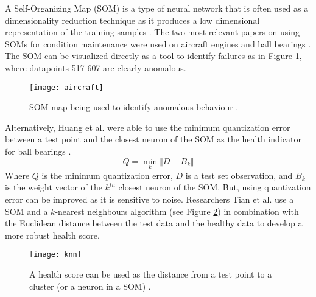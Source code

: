 A Self-Organizing Map (SOM) is a type of neural network that is often used as a dimensionality reduction technique as it produces a low dimensional representation of the training samples \cite{map1990self}.
The two most relevant papers on using SOMs for condition maintenance were used on aircraft engines and ball bearings \cite{come2010aircraft} \cite{Tian2014AnomalyDU}.
The SOM can be visualized directly as a tool to identify failures as in Figure \ref{aircraft}, where datapoints 517-607 are clearly anomalous.
\begin{figure}[!h]
    \texttt{[image: aircraft]}
    \centering
    \caption{SOM map being used to identify anomalous behaviour \cite{come2010aircraft}.}
    \label{aircraft}
\end{figure}
Alternatively, Huang et al. were able to use the minimum quantization error between a test point and the closest neuron of the SOM as the health indicator for ball bearings \cite{som-1}.
\begin{equation}
	Q = \min_{k} \Vert D-B_k \Vert
\end{equation}
 Where $Q$ is the minimum quantization error, $D$ is a test set observation, and $B_k$ is the weight vector of the $k^{th}$ closest neuron of the SOM.
But, using quantization error can be improved as it is sensitive to noise.
Researchers Tian et al. use a SOM and a $k$-nearest neighbours algorithm (see Figure \ref{knn}) in combination with the Euclidean distance between the test data and the healthy data to develop a more robust health score.
\begin{figure}[!h]
    \texttt{[image: knn]}
    \centering
    \caption{A health score can be used as the distance from a test point to a cluster (or a neuron in a SOM) \cite{Tian2014AnomalyDU}.}
    \label{knn}
\end{figure}
